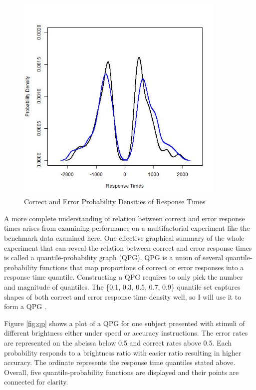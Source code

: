 \documentclass[12pt]{article}
\begin{document}
%
\begin{figure}
\centering
\includegraphics[width=0.9\textwidth]{Cond_distr_RRdata}
\caption{Correct and Error Probability Densities of Response Times}
\label{fig:conddist}
\end{figure}
%

A more complete understanding of relation between correct and error response times arises from examining performance on a multifactorial experiment like the benchmark data examined here.
One effective graphical summary of the whole experiment that can reveal the relation between correct and error response times is called a quantile-probability graph (QPG). QPG is a union of several quantile-probability functions that map proportions of correct or error responses into a response time quantile. Constructing a QPG requires to only pick the number and magnitude of quantiles. The \{0.1, 0.3, 0.5, 0.7, 0.9\} quantile set captures shapes of both correct and error response time density well, so I will use it to form a QPG  \citep{RatTue2002,RatMck2008}.

Figure \ref{fig:qp} shows a plot of a QPG for one subject presented with stimuli of different brightness either under speed or accuracy instructions. The error rates are represented on the abcissa below 0.5 and correct rates above 0.5. Each probability responds to a brightness ratio with easier ratio resulting in higher accuracy. The ordinate represents the response time quantiles stated above. Overall, five quantile-probability functions are displayed and their points are connected for clarity.
\end{document}
